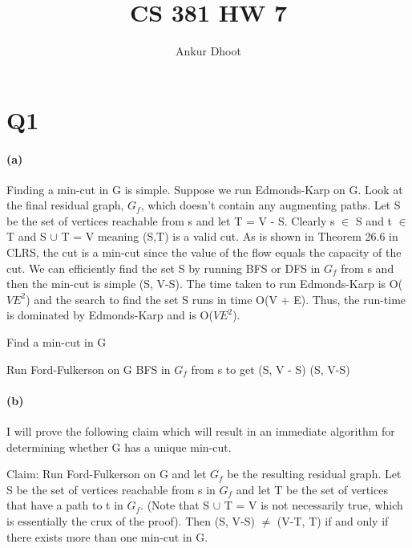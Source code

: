 \documentclass[11pt,a4paper]{article}
\begin{document}
\author{Ankur Dhoot}
\title{CS 381 HW 7}
\maketitle

\section*{Q1}

	\paragraph{(a)}
	Finding a min-cut in G is simple. Suppose we run Edmonds-Karp on G. Look at the final residual graph, $G_{f}$, which doesn't contain any augmenting paths. Let S be the set of vertices reachable from s and let T = V - S. Clearly s $\in$ S and t $\in$ T and S $\cup$ T = V meaning (S,T) is a valid cut. As is shown in Theorem 26.6 in CLRS, the cut is a min-cut since the value of the flow equals the capacity of the cut. We can efficiently find the set S by running BFS or DFS in $G_{f}$ from s and then the min-cut is simple (S, V-S). The time taken to run Edmonds-Karp is O($VE^{2}$) and the search to find the set S runs in time O(V + E). Thus, the run-time is dominated by Edmonds-Karp and is O($VE^{2}$).
	
	\begin{algorithm}
	\caption{Find a min-cut in G}
	\begin{algorithmic}[1]
	\State Run Ford-Fulkerson on G
	\State BFS in $G_{f}$ from s to get (S, V - S)
	\State \Return (S, V-S)
	\EndFunction
	\end{algorithmic}
	\end{algorithm}
	
	\paragraph{(b)}
	I will prove the following claim which will result in an immediate algorithm for determining whether G has a unique min-cut. \newline

	Claim: Run Ford-Fulkerson on G and let $G_{f}$ be the resulting residual graph. Let S be the set of vertices reachable from s in $G_{f}$ and let T be the set of vertices that have a path to t in $G_{f}$. (Note that S $\cup$ T = V is not necessarily true, which is essentially the crux of the proof). Then (S, V-S) $\neq$ (V-T, T) if and only if there exists more than one min-cut in G. \newline
	
\end{document}
